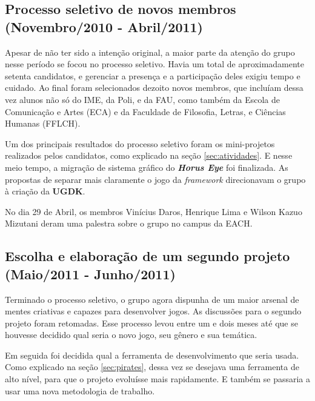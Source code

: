 \documentclass[12pt,onecolumn,a4paper]{article}
\begin{document}
    \subsection{Processo seletivo de novos membros \\
                {\small(Novembro/2010 - Abril/2011)} }
        Apesar de não ter sido a intenção original, a maior parte da atenção do grupo nesse período
        se focou no processo seletivo. Havia um total de aproximadamente setenta candidatos, e
        gerenciar a presença e a participação deles exigiu tempo e cuidado. Ao final foram
        selecionados dezoito novos membros, que incluíam dessa vez alunos não só do IME, da Poli, e
        da FAU, como também da Escola de Comunicação e Artes (ECA) e da Faculdade de Filosofia,
        Letras, e Ciências Humanas (FFLCH).
        
        Um dos principais resultados do processo seletivo foram os mini-projetos realizados pelos
        candidatos, como explicado na seção \ref{sec:atividades}. E nesse meio tempo, a migração de
        sistema gráfico do \textit{\textbf{Horus Eye}} foi finalizada. As propostas de separar mais
        claramente o jogo da \textit{framework} direcionavam o grupo à criação da \textbf{UGDK}.
        
        No dia 29 de Abril, os membros Vinícius Daros, Henrique Lima e Wilson Kazuo Mizutani deram
        uma palestra sobre o grupo no campus da EACH.

    \clearpage
    \subsection{Escolha e elaboração de um segundo projeto \\
                {\small(Maio/2011 - Junho/2011)} }
        Terminado o processo seletivo, o grupo agora dispunha de um maior arsenal de mentes
        criativas e capazes para desenvolver jogos. As discussões para o segundo projeto foram
        retomadas. Esse processo levou entre um e dois meses até que se houvesse decidido qual seria
        o novo jogo, seu gênero e sua temática.
        
        Em seguida foi decidida qual a ferramenta de desenvolvimento que seria usada. Como explicado
        na seção \ref{sec:pirates}, dessa vez se desejava uma ferramenta de alto nível, para que o
        projeto evoluísse mais rapidamente. E também se passaria a usar uma nova metodologia de
        trabalho.
        
\end{document}
